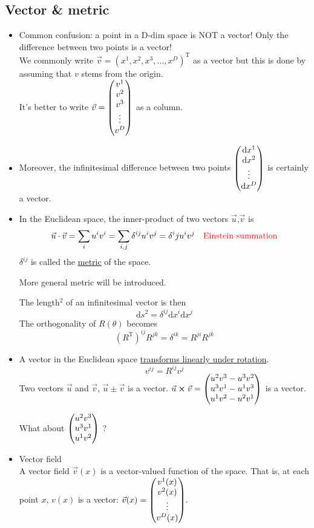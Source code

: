 \documentclass[11pt,fleqn]{book} %
\begin{document}
\subsection{Vector \& metric}
\begin{itemize}[label={--}, leftmargin=*]
\item Common confusion: a point in a D-dim space is \uppercase{not} a vector! Only the
  difference between two points is a vector! \\
  We commonly write \(\vec{v} = (x^1, x^2, x^3 ,\dots, x^D)^{\mathrm{T}}\) as a
  vector but this is done by assuming that \(v\) stems from the origin. \\
  It's better to write \(\vec{v} = \mqty(v^1\\v^2\\v^3\\\vdots\\v^D)\) as a column.
\item Moreover, the infinitesimal difference between two points
  \(\mqty(\mathrm{d}x^1 \\ \mathrm{d}x^2 \\ \vdots \\ \mathrm{d}x^D)\) is
  certainly a vector.
\item In the Euclidean space, the inner-product of two vectors
  \(\vec{u}\),\(\vec{v}\) is \[\vec{u} \cdot \vec{v} = \sum_i u^i v^i =
    \sum_{i,j} \delta^{ij} u^i v^j = \delta^ij u^i v^j \quad \text{\textcolor{red}{Einstein
    summation}}\]
  \(\delta^{ij}\) is called the \uline{metric} of the space. \\
  \begin{remark}
    More general metric will be introduced.
  \end{remark}
  The length\(^2\) of an infinitesimal vector is then
  \[\mathrm{d}s^2 = \delta^{ij} \mathrm{d}x^i \mathrm{d}x^j\]
  The orthogonality of \(R(\theta)\) becomes
  \[\left(R^{\mathrm{T}}\right)^{ij} R^{jk} = \delta^{ik} = R^{ji} R^{jk}\]
\item A vector in the Euclidean space \uline{transforms linearly under rotation}.
  \[v^{ij} = R^{ij} v^j\]
  Two vectors \(\vec{u}\) and \(\vec{v}\), \(\vec{u} \pm \vec{v}\) is a vector.
  \(\vec{u} \cross \vec{v} = \mqty(u^2 v^3 - u^3 v^2 \\ u^3 v^1 - u^1 v^3 \\ u^1
  v^2 - u^2 v^1)\) is a vector.
  \begin{problem}
    What about \(\mqty(u^2 v^3 \\ u^3 v^1 \\ u^1 v^2)\) ?
  \end{problem}
\item Vector field \\
  A vector field \(\vec{v}(x)\) is a vector-valued function of the space. That
  is, at each point \(x\), \(v(x)\) is a vector:
  \(\vec{v}(x) = \mqty(v^1(x) \\ v^2(x) \\ \vdots \\ v^D(x)).\)
\end{itemize}
\end{document}
